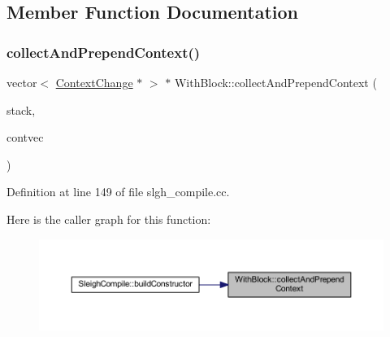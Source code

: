 \subsection{Member Function Documentation}
\mbox{\label{class_with_block_a76f78948cc2b5489881a43fdc92158bd}} 
\subsubsection{\texorpdfstring{collectAndPrependContext()}{collectAndPrependContext()}}
{\footnotesize\ttfamily vector$<$ \mbox{\hyperlink{class_context_change}{Context\+Change}} $\ast$ $>$ $\ast$ With\+Block\+::collect\+And\+Prepend\+Context (\begin{DoxyParamCaption}\item[{const list$<$ \mbox{\hyperlink{class_with_block}{With\+Block}} $>$ \&}]{stack,  }\item[{vector$<$ \mbox{\hyperlink{class_context_change}{Context\+Change}} $\ast$ $>$ $\ast$}]{contvec }\end{DoxyParamCaption})\hspace{0.3cm}{\ttfamily [static]}}



Definition at line 149 of file slgh\+\_\+compile.\+cc.

Here is the caller graph for this function\+:
\nopagebreak
\begin{figure}[H]
\begin{center}
\leavevmode
\includegraphics[width=350pt]{class_with_block_a76f78948cc2b5489881a43fdc92158bd_icgraph}
\end{center}
\end{figure}
\mbox{\label{class_with_block_a700a2814e4ba5491e74fe73822ed8901}} 
